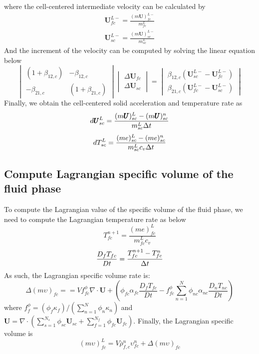 \documentclass[preprint,12pt]{elsarticle}
\begin{document}
%
%
where the cell-centered intermediate velocity can be calculated by
%
\begin{equation}
\begin{gathered}
\pmb{U}_{fc}^{L-} = \frac{(m \pmb{U})_{fc}^{L-}}{m_{fc}^L} \\
\pmb{U}_{sc}^{L-} = \frac{(m \pmb{U})_{sc}^{L-}}{m_{sc}^L} 
\end{gathered}
\end{equation}
%
%
And the increment of the velocity can be computed by solving the linear equation below
%
\[ \begin{vmatrix} (1 + \beta_{12,c})  &  -\beta_{12,c} \\
                  -\beta_{21,c}       &  (1 + \beta_{21,c})
    \end{vmatrix}
    \begin{vmatrix} \Delta \pmb{U}_{fc} \\
                    \Delta \pmb{U}_{sc}
    \end{vmatrix}
    =
    \begin{vmatrix}  \beta_{12,c}(\pmb{U}_{sc}^{L-} - \pmb{U}_{fc}^{L-}) \\
                    \beta_{21,c}(\pmb{U}_{fc}^{L-} - \pmb{U}_{sc}^{L-})
    \end{vmatrix}                
\]
%
Finally, we obtain the cell-centered solid  acceleration and temperature rate as
%
%
\begin{equation}
 d\pmb{U}_{sc}^L = \frac{(m \pmb{U})_{sc}^L - (m \pmb{U})_{sc}^n}{m_{sc}^L \Delta{t}}
\end{equation}
%
\begin{equation}
 dT_{sc}^L = \frac{(me)_{sc}^L - (me)_{sc}^n}{m_{sc}^L c_v \Delta{t}}
\end{equation}
%
%
\subsection{\textsf{Compute Lagrangian specific volume of the fluid phase}}
To compute the Lagrangian value of the specific volume of the fluid phase, we need to compute the Lagrangian temperature rate as below
%
%
\begin{equation}
 T_{fc}^{n+1} = \frac{(me)_{fc}^L}{m_{fc}^L c_v}
\end{equation}
%
%
\begin{equation}
 \frac{D_f T_{fc}}{Dt} =  \frac{T_{fc}^{n+1} - T_{fc}^{n}}{\Delta{t}}
\end{equation}
%
%
As such, the Lagrangian specific volume rate is:
%
%
\begin{equation}
 \Delta (m \upsilon)_{fc} == V f_{fc}^{\phi} \nabla \cdot \pmb{U} + (\phi_{fc} \alpha_{fc} \frac{D_f T_{fc}}{Dt} - f_{fc}^{\phi} \sum_{n=1}^{N} \phi_{nc} \alpha_{nc} \frac{D_n T_{nc}}{Dt})
\end{equation}
%
%
where $ f_f^{\phi} = (\phi_f  \kappa_f ) / (\sum_{n=1}^{N} \phi_n \kappa_n)$ and  $\pmb{U} = \nabla \cdot (\sum_{s=1}^{N_s} \phi_{sc} \pmb{U}_{sc} + \sum_{f=1}^{N_f}  \phi_{fc} \pmb{U}_{fc})$.
%
%
Finally, the Lagrangian specific volume is
\begin{equation}
 (m \upsilon)_{fc}^L = V \overline{\rho}_{f,c}^n \upsilon_{fc}^n + \Delta (m\upsilon)_{fc} 
\end{equation}
%
%
\end{document}
